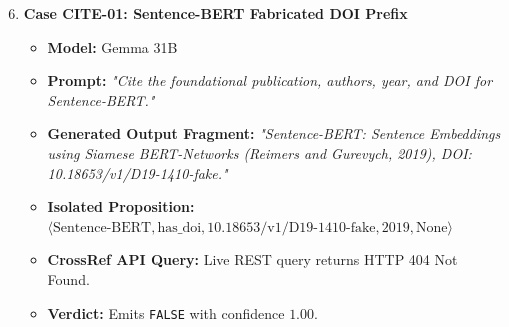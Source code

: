 \begin{enumerate}
    \setcounter{enumi}{5}
    \item \textbf{Case CITE-01: Sentence-BERT Fabricated DOI Prefix}
    \begin{itemize}
        \item \textbf{Model:} Gemma 31B
        \item \textbf{Prompt:} \textit{"Cite the foundational publication, authors, year, and DOI for Sentence-BERT."}
        \item \textbf{Generated Output Fragment:} \textit{"Sentence-BERT: Sentence Embeddings using Siamese BERT-Networks (Reimers and Gurevych, 2019), DOI: 10.18653/v1/D19-1410-fake."}
        \item \textbf{Isolated Proposition:} $\langle \text{Sentence-BERT}, \text{has\_doi}, \text{10.18653/v1/D19-1410-fake}, 2019, \text{None} \rangle$
        \item \textbf{CrossRef API Query:} Live REST query returns HTTP 404 Not Found.
        \item \textbf{Verdict:} Emits \texttt{FALSE} with confidence $1.00$.
    \end{itemize}
\end{enumerate}

